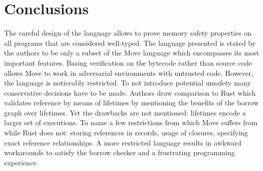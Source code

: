 \section{Conclusions}

The careful design of the language allows to prove memory safety properties on all programs that are considered well-typed. The language presented is stated by the authors to be only a subset of the Move language which encompasses its most important features. Basing verification on the bytecode rather than source code allows Move to work in adversarial environments with untrusted code. However, the language is noticeably restricted. To not introduce potential unsafety many conservative decisions have to be made. Authors draw comparison to Rust which validates reference by means of lifetimes by mentioning the benefits of the borrow graph over lifetimes. Yet the drawbacks are not mentioned: lifetimes encode a larger set of executions. To name a few restrictions from which Move suffers from while Rust does not: storing references in records, usage of closures, specifying exact reference relationships. A more restricted language results in awkward workarounds to satisfy the borrow checker and a frustrating programming experience.

